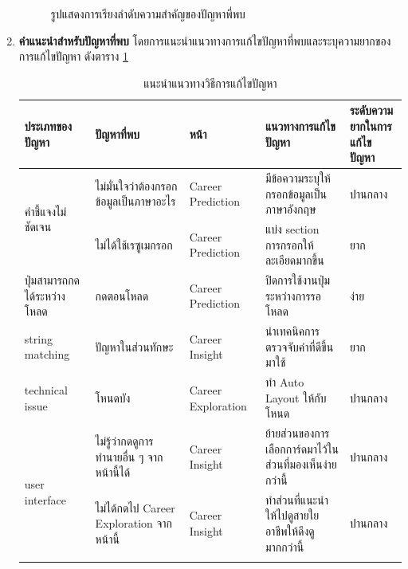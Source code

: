 \begin{enumerate}
\begin{figure}[H]
              \caption{รูปแสดงการเรียงลำดับความสำคัญของปัญหาพี่พบ}\label{fig:PrioritizeUT}
          \end{figure}
    \item \textbf{คำแนะนำสำหรับปัญหาที่พบ} โดยการแนะนำแนวทางการแก้ไขปัญหาที่พบและระบุความยากของการแก้ไขปัญหา ดังตาราง \ref{tab:recommendationsUT}
          \begin{table}[H]
              \caption{แนะนำแนวทางวิธีการแก้ไขปัญหา}
              \label{tab:recommendationsUT}
              \begin{tabularx}{\textwidth}{|l|X|l|X|X|}
                  \hline
                  \textbf{ประเภทของปัญหา}                 & \textbf{ปัญหาที่พบ}                    & \textbf{หน้า}      & \textbf{แนวทางการแก้ไขปัญหา}                          & \textbf{ระดับความยากในการแก้ไขปัญหา} \\ \hline
                  \multirow[t]{2}{*}{คำชี้แจงไม่ชัดเจน} & ไม่มั่นใจว่าต้องกรอกข้อมูลเป็นภาษาอะไร     & Career Prediction  & มีข้อความระบุให้กรอกข้อมูลเป็นภาษาอังกฤษ                  & ปานกลาง                  \\ \cline{2-5}
                                                      & ไม่ได้ใช้เรซูเมกรอก                 & Career Prediction  & แบ่ง section การกรอกให้ละเอียดมากขึ้น                  & ยาก               \\ \hline
                  ปุ่มสามารถกดได้ระหว่างโหลด                  & กดตอนโหลด                         & Career Prediction  & ปิดการใช้งานปุ่มระหว่างการรอโหลด                       & ง่าย                    \\ \hline
                  string matching                     & ปัญหาในส่วนทักษะ                  & Career Insight     & นำเทคนิคการตรวจจับคำที่ดีขึ้นมาใช้                          & ยาก               \\ \hline
                  technical issue                     & โหนดบัง                            & Career Exploration & ทำ Auto Layout ให้กับโหนด                           & ปานกลาง                  \\ \hline
                  \multirow[t]{3}{*}{user interface}  & ไม่รู้ว่ากดดูการทำนายอื่น ๆ จากหน้านี้ได้ & Career Insight     & ย้ายส่วนของการเลือกการ์ดมาไว้ในส่วนที่มองเห็นง่ายกว่านี้ & ปานกลาง                  \\ \cline{2-5}
                                                      & ไม่ได้กดไป Career Exploration จากหน้านี้                & Career Insight     & ทำส่วนที่แนะนำให้ไปดูสายใยอาชีพให้ดึงดูมากกว่านี้          & ปานกลาง                  \\ \cline{2-5}

\end{tabularx}
\end{table}
\end{enumerate}
